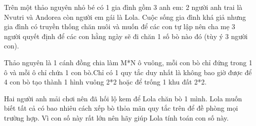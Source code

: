 Trên một thảo nguyên nhỏ bé có 1 gia đình gồm 3 anh em: 2 người anh trai là Nvutri và Andorea còn người em gái là Lola. Cuộc sống gia đình khá giả nhưng gia đình có truyền thống chăn nuôi và muốn để các con tự lập nên cha mẹ 3 người quyết định để các con hằng ngày sẽ đi chăn 1 số bò nào đó (tùy ý 3 người con).  

   Thảo nguyên là 1 cánh đồng chia làm M*N ô vuông, mỗi con bò chỉ đứng trong 1 ô và mỗi ô chỉ chứa 1 con bò.Chỉ có 1 quy tắc duy nhất là không bao giờ được để 4 con bò tạo thành 1 hình vuông 2*2 hoặc để trống 1 khu đất 2*2.  

   Hai người anh mải chơi nên đã hối lộ kem để Lola chăn bò 1 mình. Lola muốn biết tất cả có bao nhiêu cách xếp bò thỏa mãn quy tắc trên để đề phòng mọi trường hợp. Vì con số này rất lớn nên hãy giúp Lola tính toán con số này.